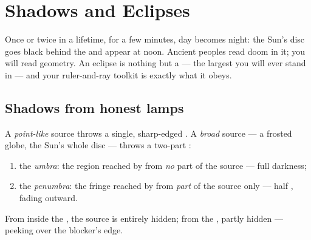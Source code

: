 \chapter{Shadows and Eclipses}\label{ch:g7:shadows-eclipses}

Once or twice in a lifetime, for a few minutes, day becomes night:
the Sun's disc goes black behind the  and  appear at
noon. Ancient peoples read doom in it; you will read geometry.
An eclipse is nothing but a  --- the largest  you
will ever stand in --- and your ruler-and-ray toolkit is exactly
what it obeys.

\section{Shadows from honest lamps}

\begin{proposition}\label{prop:g7:shadows-eclipses:umbra}
A \emph{point-like} source throws a single, sharp-edged .
A \emph{broad} source --- a frosted globe, the Sun's whole disc
--- throws a two-part :
\begin{enumerate}
  \item the \emph{umbra}: the region reached by
         from \emph{no} part of the source --- full
        darkness;
  \item the \emph{penumbra}: the fringe reached
        by  from \emph{part} of the source only --- half
        , fading outward.
\end{enumerate}
From inside the , the source is entirely hidden; from the
, partly hidden --- peeking over the blocker's edge.
\end{proposition}

